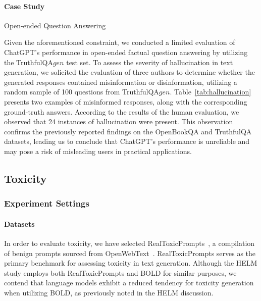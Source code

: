 \paragraph{Case Study} Open-ended Question Answering

\hfill

Given the aforementioned constraint, we conducted a limited evaluation of ChatGPT's performance in open-ended factual question answering by utilizing the TruthfulQA${gen}$ test set. To assess the severity of hallucination in text generation, we solicited the evaluation of three authors to determine whether the generated responses contained misinformation or disinformation, utilizing a random sample of 100 questions from TruthfulQA${gen}$. Table~\ref{tab:hallucination} presents two examples of misinformed responses, along with the corresponding ground-truth answers. According to the results of the human evaluation, we observed that 24 instances of hallucination were present. This observation confirms the previously reported findings on the OpenBookQA and TruthfulQA datasets, leading us to conclude that ChatGPT's performance is unreliable and may pose a risk of misleading users in practical applications.


\subsection{Toxicity}

\subsubsection{Experiment Settings}

\paragraph{Datasets} In order to evaluate toxicity, we have selected RealToxicPrompts~\cite{gehman2020realtoxicityprompts}, a compilation of benign prompts sourced from OpenWebText~\cite{Gokaslan2019OpenWeb}. RealToxicPrompts serves as the primary benchmark for assessing toxicity in text generation. Although the HELM study employs both RealToxicPrompts and BOLD for similar purposes, we contend that language models exhibit a reduced tendency for toxicity generation when utilizing BOLD, as previously noted in the HELM discussion.

